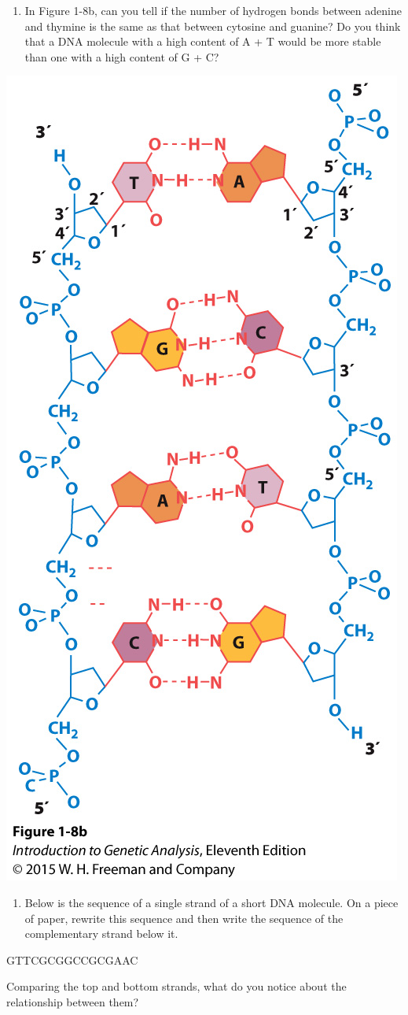 \documentclass[11pt,]{article}
\providecommand{\tightlist}{%
  \setlength{\itemsep}{0pt}\setlength{\parskip}{0pt}}
\begin{document}
\begin{blackbox}

\begin{enumerate}
\def\labelenumi{\arabic{enumi}.}
\setcounter{enumi}{5}
\tightlist
\item
  In Figure 1-8b, can you tell if the number of hydrogen bonds between
  adenine and thymine is the same as that between cytosine and guanine?
  Do you think that a DNA molecule with a high content of A + T would be
  more stable than one with a high content of G + C?
\end{enumerate}

\hfill\break

\begin{center}\includegraphics[width=0.25\linewidth,]{input/figure_01_08b} \end{center}

\vspace{11cm}

\end{blackbox}

\begin{blackbox}

\begin{enumerate}
\def\labelenumi{\arabic{enumi}.}
\setcounter{enumi}{9}
\tightlist
\item
  Below is the sequence of a single strand of a short DNA molecule. On a
  piece of paper, rewrite this sequence and then write the sequence of
  the complementary strand below it.
\end{enumerate}

\vspace{10mm}

\begin{center}

GTTCGCGGCCGCGAAC

\vspace{10mm}
\end{center}

Comparing the top and bottom strands, what do you notice about the
relationship between them?

\vspace{17cm}

\end{blackbox}
\end{document}
